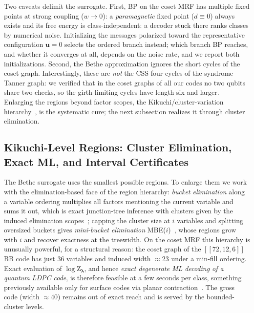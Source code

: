 \documentclass[a4paper,11pt]{quantumarticle}
\theoremstyle{definition}
\newcommand{\vu}{\boldsymbol{u}}
\newcommand{\vlam}{\boldsymbol{\lambda}}
\newcommand{\Z}{\mathrm{Z}}
\begin{document}
Two caveats delimit the surrogate. First, BP on the coset MRF has multiple
fixed points at strong coupling ($w\to0$): a \emph{paramagnetic} fixed
point ($d\equiv0$) always exists and its free energy is
class-independent: a decoder stuck there ranks classes by numerical noise.
Initializing the messages polarized toward the representative
configuration $\vu=0$ selects the ordered branch instead; which branch BP
reaches, and whether it converges at all, depends on the noise rate, and we
report both initializations. Second, the Bethe approximation ignores the
short cycles of the coset graph. Interestingly, these are \emph{not} the
CSS four-cycles of the syndrome Tanner graph: we verified that in the
coset graphs of all our codes no two qubits share two checks, so the
girth-limiting cycles have length six and larger. Enlarging the regions
beyond factor scopes, the Kikuchi/cluster-variation
hierarchy~\cite{yedidia2005}, is the systematic cure; the next subsection
realizes it through cluster elimination.

\subsection{Kikuchi-Level Regions: Cluster Elimination, Exact ML, and
Interval Certificates}
\label{sec:regions}
The Bethe surrogate uses the smallest possible regions. To enlarge them we
work with the elimination-based face of the region hierarchy: \emph{bucket
elimination} along a variable ordering multiplies all factors mentioning
the current variable and sums it out, which is exact junction-tree
inference with clusters given by the induced elimination
scopes~\cite{lauritzen1988}; capping the cluster size at $i$ variables and
splitting oversized buckets gives \emph{mini-bucket elimination}
MBE($i$)~\cite{dechter2003}, whose regions grow with $i$ and recover
exactness at the treewidth. On the coset MRF this hierarchy is unusually
powerful, for a structural reason: the coset graph of the
$[\![72,12,6]\!]$ BB code has just $36$ variables and induced width
$\approx23$ under a min-fill ordering. Exact evaluation of
$\log\Z_{\vlam}$, and hence \emph{exact degenerate ML decoding of a
quantum LDPC code}, is therefore feasible at a few seconds per class,
something previously available only for surface codes via planar
contraction~\cite{bravyi2014ml}. The gross code (width $\approx40$)
remains out of exact reach and is served by the bounded-cluster levels.
\end{document}
